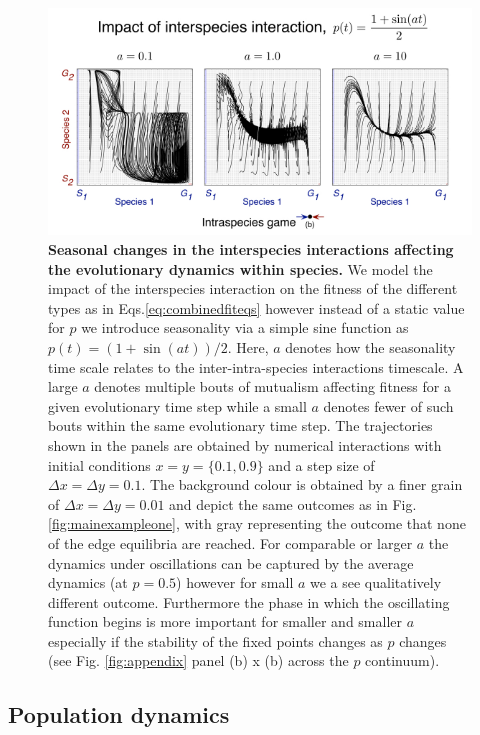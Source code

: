 \documentclass[12pt]{article}
\begin{document}
\begin{figure}
\begin{center}
\includegraphics[width=\columnwidth]{Figures/oscillating_p_reduced.pdf}
\caption{\small{
\textbf{Seasonal changes in the interspecies interactions affecting the evolutionary dynamics within species.}
We model the impact of the interspecies interaction on the fitness of the different types as in Eqs.\ref{eq:combinedfiteqs} however instead of a static value for $p$ we introduce seasonality via a simple sine function as $p(t) = (1+\sin(at))/2$.
Here, $a$ denotes how the seasonality time scale relates to the inter-intra-species interactions timescale.
A large $a$ denotes multiple bouts of mutualism affecting fitness for a given evolutionary time step while a small $a$ denotes fewer of such bouts within the same evolutionary time step.
The trajectories shown in the panels are obtained by numerical interactions with initial conditions $x = y = \{0.1,0.9\}$ and a step size of $\Delta x = \Delta y = 0.1$.
The background colour is obtained by a finer grain of $\Delta x = \Delta y = 0.01$ and depict the same outcomes as in Fig. \ref{fig:mainexampleone}, with gray representing the outcome that none of the edge equilibria are reached.
For comparable or larger $a$ the dynamics under oscillations can be captured by the average dynamics (at $p = 0.5$) however for small $a$ we a see qualitatively different outcome.
Furthermore the phase in which the oscillating function begins is more important for smaller and smaller $a$ especially if the stability of the fixed points changes as $p$ changes (see Fig. \ref{fig:appendix} panel (b) x (b) across the $p$ continuum).
 }
\label{fig:oscillations}
}
\end{center}
\end{figure}


\subsection{Population dynamics}
\end{document}
